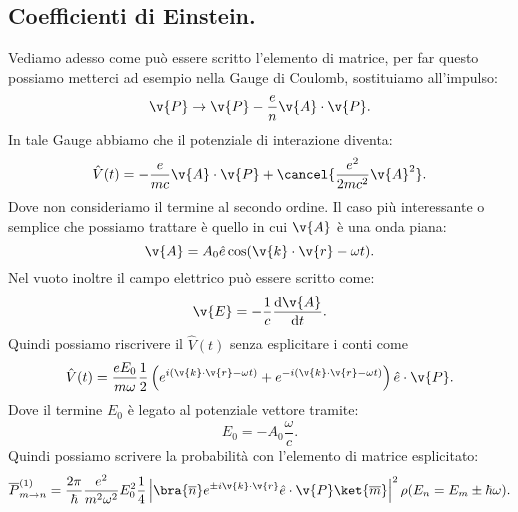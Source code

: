 \subsection{Coefficienti di Einstein.}%
\label{sub:Coefficienti di Einstein.}
Vediamo adesso come può essere scritto l'elemento di matrice, per far questo possiamo metterci ad esempio nella Gauge di Coulomb, sostituiamo all'impulso:
\[
    \v{P} \to 
\v{P}- \frac{e}{n}\v{A}\cdot \v{P}
.\] 
In tale Gauge abbiamo che il potenziale di interazione diventa:
\[
    \hat{V}(t) = -\frac{e}{mc}\v{A}\cdot \v{P} + \cancel{\frac{e^2}{2mc^2}\v{A}^2}
.\] 
Dove non consideriamo il termine al secondo ordine. Il caso più interessante o semplice che possiamo trattare è quello in cui $\v{A}$ è una onda piana:
\[
    \v{A}=A_0 \hat{e}\cos(\v{k}\cdot \v{r}-\omega t) 
.\] 
Nel vuoto inoltre il campo elettrico può essere scritto come:
\[
\v{E}= -\frac{1}{c}\frac{\text{d} \v{A}}{\text{d} t} 
.\] 
Quindi possiamo riscrivere il $\hat{V}(t) $ senza esplicitare i conti come 
\[
    \hat{V}(t) = \frac{eE_0}{m\omega} \frac{1}{2}\left(e^{i(\v{k}\cdot \v{r}-\omega t)} + e^{-i(\v{k}\cdot \v{r}-\omega t) }\right) \hat{e}\cdot \v{P}
.\] 
Dove il termine $E_0$  è legato al potenziale vettore tramite:
\[
E_0=-A_0 \frac{\omega}{c}
.\] 
Quindi possiamo scrivere la probabilità con l'elemento di matrice esplicitato:
\[
    \overline{P}^{(1)}_{m\to n}=
    \frac{2\pi}{\hbar }\frac{e^2}{m^2\omega^2}E_0^2 \frac{1}{4}
    \left|
    \bra{\overline{n}}
    e^{\pm i \v{k}\cdot \v{r}}\hat{e}\cdot \v{P} 
    \ket{\overline{m}}
    \right|^2\rho(E_n = E_m \pm \hbar \omega) 
.\] 
